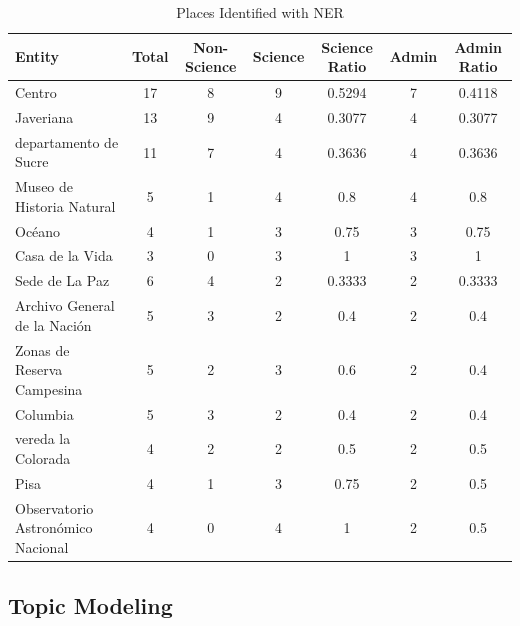 \documentclass[11pt,                                                            
 superscriptaddress,twoside,
 amsmath,amssymb,
 aps, physrev
]{revtex4-2}
\begin{document}
\begin{table}[H]
	\centering
	\caption{Places Identified with NER}
	\label{tab:ner_places_institutions}
	\begin{tabular}{lcccccc}
		\hline
		\textbf{Entity} & \textbf{Total} & \textbf{Non-Science} & \textbf{Science} & \textbf{Science Ratio} & \textbf{Admin} & \textbf{Admin Ratio} \\
		\hline
		Centro                             & 17 & 8 & 9 & 0.5294 & 7 & 0.4118 \\
		Javeriana                          & 13 & 9 & 4 & 0.3077 & 4 & 0.3077 \\
		departamento de Sucre              & 11 & 7 & 4 & 0.3636 & 4 & 0.3636 \\
		Museo de Historia Natural          & 5  & 1 & 4 & 0.8    & 4 & 0.8    \\
		Océano                             & 4  & 1 & 3 & 0.75   & 3 & 0.75   \\
		Casa de la Vida                    & 3  & 0 & 3 & 1      & 3 & 1      \\
		Sede de La Paz                     & 6  & 4 & 2 & 0.3333 & 2 & 0.3333 \\
		Archivo General de la Nación       & 5  & 3 & 2 & 0.4    & 2 & 0.4    \\
		Zonas de Reserva Campesina         & 5  & 2 & 3 & 0.6    & 2 & 0.4    \\
		Columbia                           & 5  & 3 & 2 & 0.4    & 2 & 0.4    \\
		vereda la Colorada                 & 4  & 2 & 2 & 0.5    & 2 & 0.5    \\
		Pisa                               & 4  & 1 & 3 & 0.75   & 2 & 0.5    \\
		Observatorio Astronómico Nacional  & 4  & 0 & 4 & 1      & 2 & 0.5    \\
		\hline
	\end{tabular}
\end{table}

\subsection{Topic Modeling}
\end{document}
